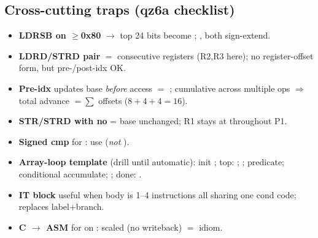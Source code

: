 \subsection{Cross-cutting traps (qz6a checklist)}
\begin{itemize}\setlength{\itemsep}{0pt}
\item \textbf{LDRSB on $\geq$0x80} $\to$ top 24 bits become ;
      ,  both sign-extend.
\item \textbf{LDRD/STRD pair} $=$ consecutive registers (R2,R3 here);
      no register-offset form, but pre-/post-idx OK.
\item \textbf{Pre-idx \asm{!}} updates base \emph{before} access $=$
      ; cumulative across multiple \asm{!} ops $\Rightarrow$
      total advance $= \sum$ offsets ($8+4+4=16$).
\item \textbf{STR/STRD with no \asm{!}} = base unchanged;
      R1 stays at  throughout P1.
\item \textbf{Signed cmp} for : use
       (\emph{not} ).
\item \textbf{Array-loop template} (drill until automatic):
      init ; top: ;
      ; predicate; conditional accumulate;
      ; done: .
\item \textbf{IT block} useful when body is 1--4 instructions all
      sharing one cond code; replaces label+branch.
\item \textbf{C $\to$ ASM} for  on : scaled
       (no writeback) $=$  idiom.
\end{itemize}
